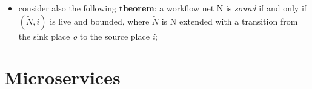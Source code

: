 \documentclass[oneside]{article}
\begin{document}
\begin{itemize}
    \item consider also the following \textbf{theorem}: a workflow net N is \textit{sound} if and only if $(\tilde N,i)$ is live and bounded, where $\tilde N$ is N extended with a transition from the sink place \textit{o} to the source place \textit{i};
\end{itemize}








\section{Microservices}
\end{document}
